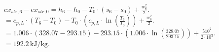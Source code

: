 \( ex_{str,6} - ex_{str,0} = h_6 - h_0 - T_0 \cdot (s_6 - s_0) + \frac{w_6^2}{2} \).  
\( = c_{p,L} \cdot (T_6 - T_0) - T_0 \cdot (c_{p,L} \cdot \ln \left( \frac{T_6}{T_0} \right)) + \frac{w_6^2}{2} \).  
\( = 1.006 \cdot (328.07 - 293.15) - 293.15 \cdot (1.006 \cdot \ln \left( \frac{328.07}{293.15} \right)) + \frac{510^2}{2 \cdot 10^3} \).  
\( = 192.2 \, \text{kJ/kg} \).